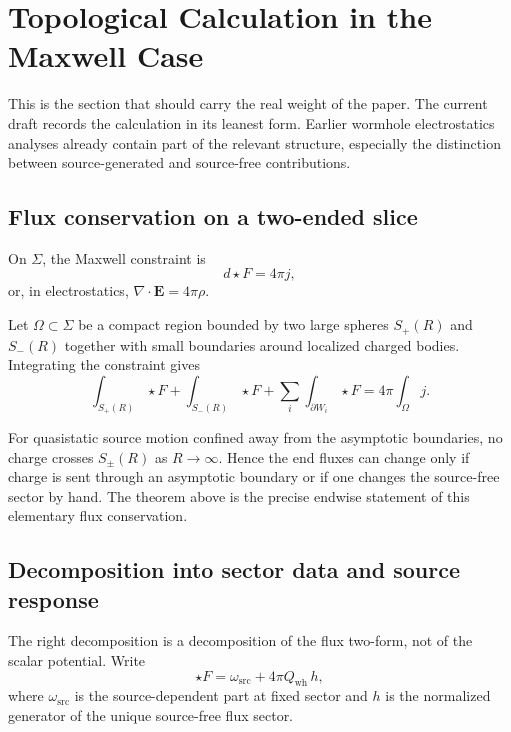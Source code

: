 \documentclass[aps,prd,onecolumn,nofootinbib,superscriptaddress]{revtex4-2}
\begin{document}
\section{Topological Calculation in the Maxwell Case}

This is the section that should carry the real weight of the paper. The current draft records the calculation in its leanest form. Earlier wormhole electrostatics analyses already contain part of the relevant structure, especially the distinction between source-generated and source-free contributions.\cite{KhusnutdinovBakhmatov2007SelfForce,Krasnikov2008ElectrostaticInteraction}

\subsection{Flux conservation on a two-ended slice}

On $\Sigma$, the Maxwell constraint is
\begin{equation}
d \star F = 4\pi j,
\end{equation}
or, in electrostatics, $\nabla \cdot \bm{E} = 4\pi \rho$.

Let $\Omega \subset \Sigma$ be a compact region bounded by two large spheres $S_{+}(R)$ and $S_{-}(R)$ together with small boundaries around localized charged bodies. Integrating the constraint gives
\begin{equation}
\int_{S_{+}(R)} \star F + \int_{S_{-}(R)} \star F + \sum_i \int_{\partial W_i} \star F = 4\pi \int_{\Omega} j.
\end{equation}

For quasistatic source motion confined away from the asymptotic boundaries, no charge crosses $S_{\pm}(R)$ as $R \to \infty$. Hence the end fluxes can change only if charge is sent through an asymptotic boundary or if one changes the source-free sector by hand. The theorem above is the precise endwise statement of this elementary flux conservation.

\subsection{Decomposition into sector data and source response}

The right decomposition is a decomposition of the flux two-form, not of the scalar potential. Write
\begin{equation}
\star F = \omega_{\mathrm{src}} + 4\pi Q_{\mathrm{wh}}\, h,
\end{equation}
where $\omega_{\mathrm{src}}$ is the source-dependent part at fixed sector and $h$ is the normalized generator of the unique source-free flux sector.
\end{document}
